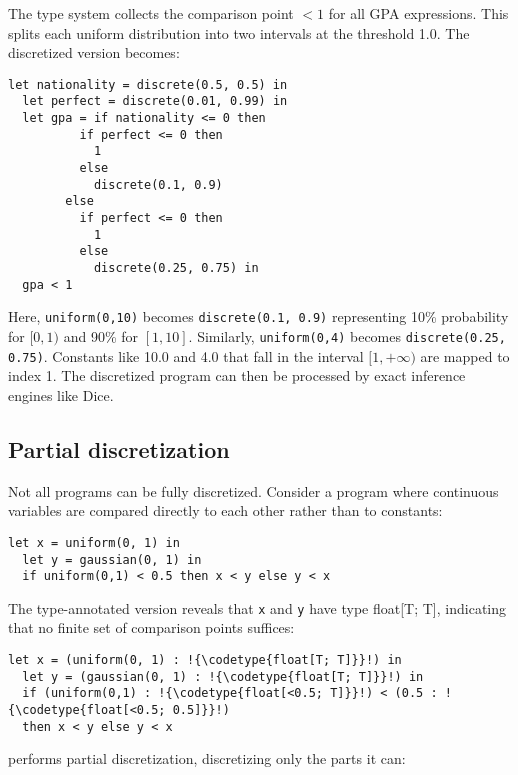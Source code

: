\documentclass[acmsmall,screen,dvipsnames,x11names,nonacm,anonymous,review]{acmart}
\newcommand{\codetype}[1]{\textcolor{typecolor}{\ttfamily\small#1}}
\newcommand{\Slice}{\text{\scshape Slice}\xspace}
\begin{document}
\noindent The type system collects the comparison point $<1$ for all GPA expressions. This splits each uniform distribution into two intervals at the threshold 1.0. The discretized version becomes:

\begin{lstlisting}[aboveskip=1em,belowskip=1em]
  let nationality = discrete(0.5, 0.5) in
  let perfect = discrete(0.01, 0.99) in
  let gpa = if nationality <= 0 then
          if perfect <= 0 then
            1
          else
            discrete(0.1, 0.9)
        else
          if perfect <= 0 then
            1
          else
            discrete(0.25, 0.75) in
  gpa < 1
\end{lstlisting}

\noindent Here, \texttt{uniform(0,10)} becomes \texttt{discrete(0.1, 0.9)} representing 10\% probability for $[0,1)$ and 90\% for $[1,10]$. Similarly, \texttt{uniform(0,4)} becomes \texttt{discrete(0.25, 0.75)}. Constants like 10.0 and 4.0 that fall in the interval $[1,+\infty)$ are mapped to index 1. The discretized program can then be processed by exact inference engines like Dice.

\subsection{Partial discretization}

Not all programs can be fully discretized. Consider a program where continuous variables are compared directly to each other rather than to constants:

\begin{lstlisting}[aboveskip=1em,belowskip=1em,escapechar=!]
  let x = uniform(0, 1) in
  let y = gaussian(0, 1) in
  if uniform(0,1) < 0.5 then x < y else y < x
\end{lstlisting}

\noindent The type-annotated version reveals that \texttt{x} and \texttt{y} have type \codetype{float[T; T]}, indicating that no finite set of comparison points suffices:

\begin{lstlisting}[aboveskip=1em,belowskip=1em,escapechar=!]
  let x = (uniform(0, 1) : !{\codetype{float[T; T]}}!) in
  let y = (gaussian(0, 1) : !{\codetype{float[T; T]}}!) in
  if (uniform(0,1) : !{\codetype{float[<0.5; T]}}!) < (0.5 : !{\codetype{float[<0.5; 0.5]}}!) 
  then x < y else y < x
\end{lstlisting}

\noindent \Slice performs partial discretization, discretizing only the parts it can:
\end{document}
